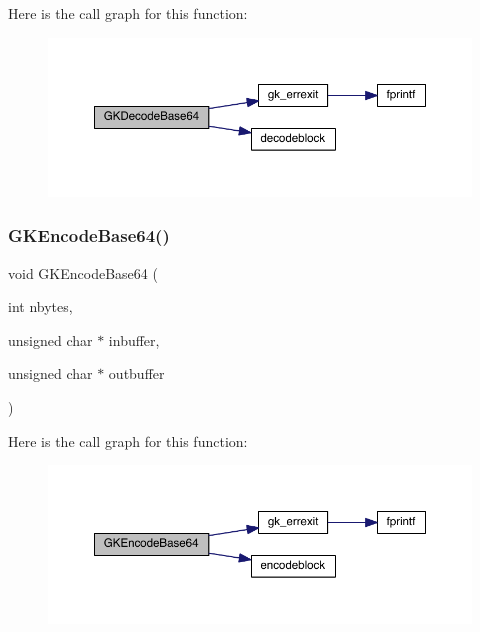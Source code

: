 Here is the call graph for this function\+:\nopagebreak
\begin{figure}[H]
\begin{center}
\leavevmode
\includegraphics[width=350pt]{a00014_a489bc1aa604dc1c8bc1fcb4e404de26a_cgraph}
\end{center}
\end{figure}
\mbox{\label{a00014_a63253b29fd38d41463013481ce7e7f0a}} 
\subsubsection{\texorpdfstring{G\+K\+Encode\+Base64()}{GKEncodeBase64()}}
{\footnotesize\ttfamily void G\+K\+Encode\+Base64 (\begin{DoxyParamCaption}\item[{int}]{nbytes,  }\item[{unsigned char $\ast$}]{inbuffer,  }\item[{unsigned char $\ast$}]{outbuffer }\end{DoxyParamCaption})}

Here is the call graph for this function\+:\nopagebreak
\begin{figure}[H]
\begin{center}
\leavevmode
\includegraphics[width=350pt]{a00014_a63253b29fd38d41463013481ce7e7f0a_cgraph}
\end{center}
\end{figure}
